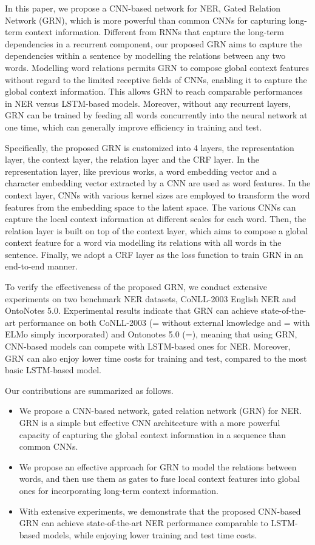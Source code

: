 \documentclass[letterpaper]{article} \usepackage{aaai19}  \usepackage{times}  \usepackage{helvet}  \usepackage{courier}  \usepackage{url}  \usepackage{graphicx}  \usepackage{amsmath}
\newcommand{\ie}{\text{i.e.,}}
\newcommand{\GRN}{GRN}
\begin{document}
In this paper, we propose a CNN-based network for NER, \ie{} Gated Relation Network (\GRN{}), which is more powerful than common CNNs for capturing long-term context information. Different from RNNs that capture the long-term dependencies in a recurrent component, our proposed \GRN{} aims to capture the dependencies within a sentence by modelling the relations between any two words. Modelling word relations permits \GRN{} to compose global context features without regard to the limited receptive fields of CNNs, enabling it to capture the global context information. This allows \GRN{} to reach comparable performances in NER versus LSTM-based models. Moreover, without any recurrent layers, \GRN{} can be trained by feeding all words concurrently into the neural network at one time, which can generally improve efficiency in training and test.

Specifically, the proposed \GRN{} is customized into 4 layers, \ie{} the representation layer, the context layer, the relation layer and the CRF layer. In the representation layer, like previous works, a word embedding vector and a character embedding vector extracted by a CNN are used as word features. In the context layer, CNNs with various kernel sizes are employed to transform the word features from the embedding space to the latent space. The various CNNs can capture the local context information at different scales for each word. Then, the relation layer is built on top of the context layer, which aims to compose a global context feature for a word via modelling its relations with all words in the sentence. Finally, we adopt a CRF layer as the loss function to train \GRN{} in an end-to-end manner.

To verify the effectiveness of the proposed \GRN{}, we conduct extensive experiments on two benchmark NER datasets, \ie{} CoNLL-2003 English NER and OntoNotes 5.0. Experimental results indicate that \GRN{} can achieve state-of-the-art performance on both CoNLL-2003 (= without external knowledge and = with ELMo \cite{peters2018deep} simply incorporated) and Ontonotes 5.0 (=), meaning that using \GRN{}, CNN-based models can compete with LSTM-based ones for NER. Moreover, \GRN{} can also enjoy lower time costs for training and test, compared to the most basic LSTM-based model.

Our contributions are summarized as follows.
\begin{itemize}
\item We propose a CNN-based network, \ie{} gated relation network (\GRN{}) for NER. \GRN{} is a simple but effective CNN architecture with a more powerful capacity of capturing the global context information in a sequence than common CNNs.
\item We propose an effective approach for \GRN{} to model the relations between words, and then use them as gates to fuse local context features into global ones for incorporating long-term context information.
\item With extensive experiments, we demonstrate that the proposed CNN-based \GRN{} can achieve state-of-the-art NER performance comparable to LSTM-based models, while enjoying lower training and test time costs.

\end{itemize}
\end{document}
